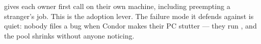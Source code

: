  gives each owner first call on their own
machine, including preempting a stranger's job. This is the adoption lever. The
failure mode it defends against is quiet: nobody files a bug when Condor makes
their PC stutter --- they run , and the pool
shrinks without anyone noticing.

